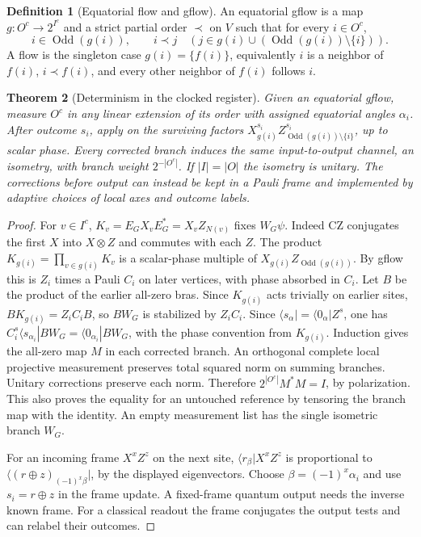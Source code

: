 \documentclass[aps,pra,onecolumn,superscriptaddress,nofootinbib,10pt]{revtex4-2}
\newtheorem{theorem}{Theorem}
\theoremstyle{definition}
\newtheorem{definition}[theorem]{Definition}
\theoremstyle{remark}
\begin{document}
\begin{definition}[Equatorial flow and gflow]\label{cp:gflow}
An equatorial gflow is a map $g:O^c\to 2^{I^c}$ and a strict partial order $\prec$ on $V$ such that for every $i\in O^c$,
\[
 i\in\operatorname{Odd}(g(i)),\qquad
 i\prec j\quad(j\in g(i)\cup(\operatorname{Odd}(g(i))\setminus\{i\})).
\]
A flow is the singleton case $g(i)=\{f(i)\}$, equivalently $i$ is a neighbor of $f(i)$, $i\prec f(i)$, and every other neighbor of $f(i)$ follows $i$.
\end{definition}

\begin{theorem}[Determinism in the clocked register]\label{cp:determinism}
Given an equatorial gflow, measure $O^c$ in any linear extension of its order with assigned equatorial angles $\alpha_i$. After outcome $s_i$, apply on the surviving factors $X_{g(i)}^{s_i}Z_{\operatorname{Odd}(g(i))\setminus\{i\}}^{s_i}$, up to scalar phase. Every corrected branch induces the same input-to-output channel, an isometry, with branch weight $2^{-|O^c|}$. If $|I|=|O|$ the isometry is unitary. The corrections before output can instead be kept in a Pauli frame and implemented by adaptive choices of local axes and outcome labels.
\end{theorem}
\begin{proof}
For $v\in I^c$, $K_v=E_GX_vE_G^*=X_v Z_{N(v)}$ fixes $W_G\psi$. Indeed $\mathrm{CZ}$ conjugates the first $X$ into $X\otimes Z$ and commutes with each $Z$. The product $K_{g(i)}=\prod_{v\in g(i)}K_v$ is a scalar-phase multiple of $X_{g(i)}Z_{\operatorname{Odd}(g(i))}$. By gflow this is $Z_i$ times a Pauli $C_i$ on later vertices, with phase absorbed in $C_i$. Let $B$ be the product of the earlier all-zero bras. Since $K_{g(i)}$ acts trivially on earlier sites, $B K_{g(i)}=Z_i C_i B$, so $B W_G$ is stabilized by $Z_i C_i$. Since $\langle s_\alpha|=\langle 0_\alpha|Z^s$, one has $C_i^s\langle s_{\alpha_i}|BW_G=\langle0_{\alpha_i}|BW_G$, with the phase convention from $K_{g(i)}$. Induction gives the all-zero map $M$ in each corrected branch. An orthogonal complete local projective measurement preserves total squared norm on summing branches. Unitary corrections preserve each norm. Therefore $2^{|O^c|}M^*M=I$, by polarization. This also proves the equality for an untouched reference by tensoring the branch map with the identity. An empty measurement list has the single isometric branch $W_G$.

For an incoming frame $X^xZ^z$ on the next site,
$\langle r_\beta|X^xZ^z$ is proportional to
$\langle(r\oplus z)_{(-1)^x\beta}|$, by the displayed eigenvectors. Choose $\beta=(-1)^x\alpha_i$ and use $s_i=r\oplus z$ in the frame update. A fixed-frame quantum output needs the inverse known frame. For a classical readout the frame conjugates the output tests and can relabel their outcomes.
\end{proof}
\end{document}
